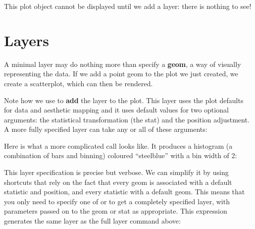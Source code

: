 % 


This plot object cannot be displayed until we add a layer: there is nothing to see!

\section{Layers}
\label{sec:layers}

A minimal layer may do nothing more than specify a {\bf geom}, a way of visually representing the data.  If we add a point geom to the plot we just created, we create a scatterplot, which can then be rendered.

% 


\noindent Note how we use \code{+} to \textbf{add} the layer to the plot.  This layer uses the plot defaults for data and aesthetic mapping and it uses default values for two optional arguments: the statistical transformation (the stat) and the position adjustment.  A more fully specified layer can take any or all of these arguments:

% 


\noindent Here is what a more complicated call looks like.  It produces a histogram (a combination of bars and binning) coloured ``steelblue'' with a bin width of 2:

% 


\noindent  This layer specification is precise but verbose. We can simplify it by using shortcuts that rely on the fact that every geom is associated with a default statistic and position, and every statistic with a default geom.  This means that you only need to specify one of  or  to get a completely specified layer, with parameters passed on to the geom or stat as appropriate.  This expression generates the same layer as the full layer command above:

% 


